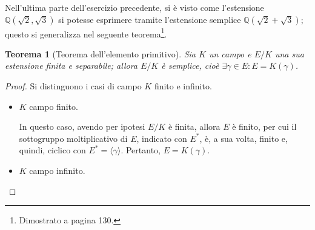 \documentclass[12pt]{scrartcl}
\theoremstyle{style}
\newtheorem{teorema}{Teorema}[section]
\numberwithin{equation}{subsection}
\begin{document}
\noindent Nell'ultima parte dell'esercizio precedente, si \`e visto come l'estensione $\mathbb{Q}(\sqrt{2} ,\sqrt{3} )$ si potesse esprimere tramite l'estensione semplice $\mathbb{Q}(\sqrt{2} +\sqrt{3} )$; questo si generalizza nel seguente teorema\footnote{Dimostrato a pagina 130.}.
\begin{teorema}
	[Teorema dell'elemento primitivo]
	Sia $K$ un campo e $E / K$ una sua estensione finita e separabile; allora $E / K$ \`e semplice, cio\`e $\exists \gamma\in E : E = K(\gamma)$.
\end{teorema}
\begin{proof}
	Si distinguono i casi di campo $K$ finito e infinito.
	\begin{itemize}
		\item $K$ campo finito.

			In questo caso, avendo per ipotesi $E / K$ \`e finita, allora $E$ \`e finito, per cui il sottogruppo moltiplicativo di $E$, indicato con $E^*$, \`e, a sua volta, finito e, quindi, ciclico con $E^* = \langle \gamma \rangle$.
			Pertanto, $E = K(\gamma)$.
		\item $K$ campo infinito.


\end{itemize}
\end{proof}
\end{document}
